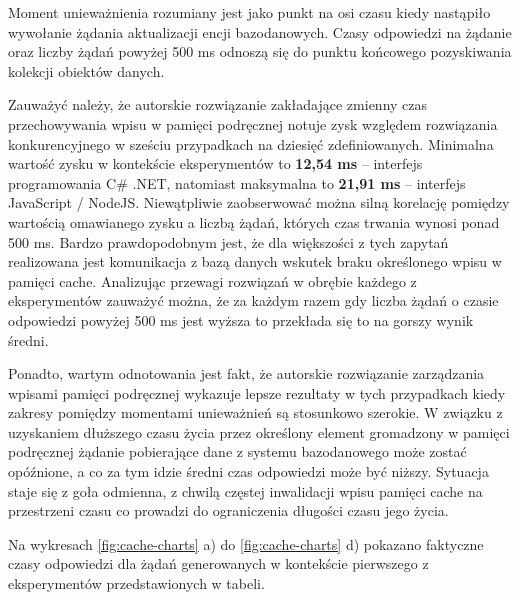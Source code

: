 Moment unieważnienia rozumiany jest jako punkt na osi czasu kiedy nastąpiło wywołanie żądania aktualizacji encji bazodanowych. Czasy odpowiedzi na żądanie oraz liczby żądań powyżej 500 ms odnoszą się do punktu końcowego pozyskiwania kolekcji obiektów danych.

Zauważyć należy, że autorskie rozwiązanie zakładające zmienny czas przechowywania wpisu w pamięci podręcznej notuje zysk względem rozwiązania konkurencyjnego w sześciu przypadkach na dziesięć zdefiniowanych. Minimalna wartość zysku w kontekście eksperymentów to \textbf{12,54 ms} -- interfejs programowania C\# .NET, natomiast maksymalna to \textbf{21,91 ms} -- interfejs JavaScript / NodeJS. Niewątpliwie zaobserwować można silną korelację pomiędzy wartością omawianego zysku a liczbą żądań, których czas trwania wynosi ponad 500 ms. Bardzo prawdopodobnym jest, że dla większości z tych zapytań realizowana jest komunikacja z bazą danych wskutek braku określonego wpisu w pamięci cache. Analizując przewagi rozwiązań w obrębie każdego z eksperymentów zauważyć można, że za każdym razem gdy liczba żądań o czasie odpowiedzi powyżej 500 ms jest wyższa to przekłada się to na gorszy wynik średni.

Ponadto, wartym odnotowania jest fakt, że autorskie rozwiązanie zarządzania wpisami pamięci podręcznej wykazuje lepsze rezultaty w tych przypadkach kiedy zakresy pomiędzy momentami unieważnień są stosunkowo szerokie. W związku z uzyskaniem dłuższego czasu życia przez określony element gromadzony w pamięci podręcznej żądanie pobierające dane z systemu bazodanowego może zostać opóźnione, a co za tym idzie średni czas odpowiedzi może być niższy. Sytuacja staje się z goła odmienna, z chwilą częstej inwalidacji wpisu pamięci cache na przestrzeni czasu co prowadzi do ograniczenia długości czasu jego życia.

Na wykresach \ref{fig:cache-charts} a) do \ref{fig:cache-charts} d) pokazano faktyczne czasy odpowiedzi dla żądań generowanych w kontekście pierwszego z eksperymentów przedstawionych w tabeli.

